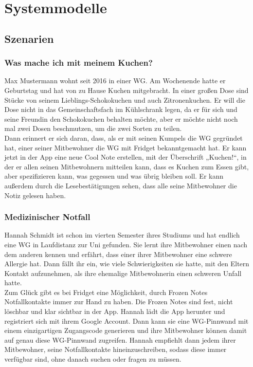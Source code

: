 \documentclass[a4paper]{scrreprt}
\begin{document}
    \chapter{Systemmodelle}
        \section{Szenarien}
        
        
        \subsection{Was mache ich mit meinem Kuchen?}
        Max Mustermann wohnt seit 2016 in einer WG. Am Wochenende hatte er Geburtstag und hat von zu Hause Kuchen mitgebracht. In einer großen Dose sind Stücke von seinem Lieblings-Schokokuchen und auch Zitronenkuchen. Er will die Dose nicht in das Gemeinschaftsfach im Kühlschrank legen, da er für sich und seine Freundin den Schokokuchen behalten möchte, aber er möchte nicht noch mal zwei Dosen beschmutzen, um die zwei Sorten zu teilen.\\
        Dann erinnert er sich daran, dass, als er mit seinen Kumpels die WG gegründet hat, einer seiner Mitbewohner die WG mit Fridget bekanntgemacht hat. Er kann jetzt in der App eine neue Cool Note erstellen, mit der Überschrift „Kuchen!“, in der er allen seinen Mitbewohnern mitteilen kann, dass es Kuchen zum Essen gibt, aber spezifizieren kann, was gegessen und was übrig bleiben soll. Er kann außerdem durch die Lesebestätigungen sehen, dass alle seine Mitbewohner die Notiz gelesen haben.
        \\
        
        \subsection{Medizinischer Notfall}
        Hannah Schmidt ist schon im vierten Semester ihres Studiums und hat endlich eine WG in Laufdistanz zur Uni gefunden. Sie lernt ihre Mitbewohner einen nach dem anderen kennen und erfährt, dass einer ihrer Mitbewohner eine schwere Allergie hat. Dann fällt ihr ein, wie viele Schwierigkeiten sie hatte, mit den Eltern Kontakt aufzunehmen, als ihre ehemalige Mitbewohnerin einen schweren Unfall hatte.\\
        Zum Glück gibt es bei Fridget eine Möglichkeit, durch Frozen Notes Notfallkontakte immer zur Hand zu haben. Die Frozen Notes sind fest, nicht löschbar und klar sichtbar in der App. Hannah lädt die App herunter und registriert sich mit ihrem Google Account. Dann kann sie eine WG-Pinnwand mit einem einzigartigen Zugangscode generieren und ihre Mitbewohner können damit auf genau diese WG-Pinnwand zugreifen. Hannah empfiehlt dann jedem ihrer Mitbewohner, seine Notfallkontakte hineinzuschreiben, sodass diese immer verfügbar sind, ohne danach suchen oder fragen zu müssen.
        \newpage
        
\end{document}
